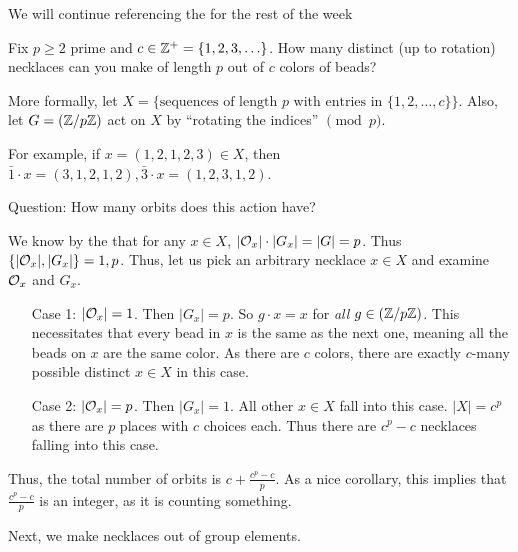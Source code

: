 \documentclass[notes.tex]{subfile}
\begin{document}
We will continue referencing the  for the rest of the week

\begin{eg}
	Fix $p\ge 2$ prime and $c\in \mathbb{Z}^+ = \{1, 2, 3, \ldots\}$.
	How many distinct (up to rotation) necklaces can you make of length $p$ out of $c$ colors of beads?

	More formally, let $X= \{\text{sequences of length } p \text{ with entries in } \{1,2,\ldots, c\}\}$.
	\tabularnewline
	Also, let $G  = (\mathbb{Z}/{p}\mathbb{Z})$ act on $X$ by ``rotating the indices'' $\pmod p$.

	For example, if $x = (1,2,1,2,3)\in X$, then $\bar 1\cdot x = (3,1,2,1,2), \bar 3\cdot x = (1,2,3,1,2)$.

	Question: How many orbits does this action have?

	We know by the  that for any $x\in X$, $|\mathcal{O}_x|\cdot|G_x| = |G| = p$. Thus $\{|\mathcal{O}_x|, |G_x|\} = {1, p}$.
	Thus, let us pick an arbitrary necklace $x\in X$ and examine $\mathcal{O}_x$ and $G_x$.
	\begin{itemize}
		\item[Case 1:] $|\mathcal{O}_x| = 1$. Then $|G_x| = p$. So $g\cdot x=x$ for \emph{all} $g\in (\mathbb{Z}/{p}\mathbb{Z})$. This necessitates that every bead in $x$ is the same as the next one, meaning all the beads on $x$ are the same color. As there are $c$ colors, there are exactly $c$-many possible distinct $x\in X$ in this case. 
		\item[Case 2:] $|\mathcal{O}_x| = p$. Then $|G_x| = 1$. All other $x\in X$ fall into this case. $|X| = c^p$ as there are $p$ places with $c$ choices each. Thus there are $c^p - c$ necklaces falling into this case.
	\end{itemize}

	Thus, the total number of orbits is $c+\frac{c^p-c}{p}$. As a nice corollary, this implies that $\frac{c^p-c}{p}$ is an integer, as it is counting something.
\end{eg}

Next, we make necklaces out of group elements.
\end{document}
